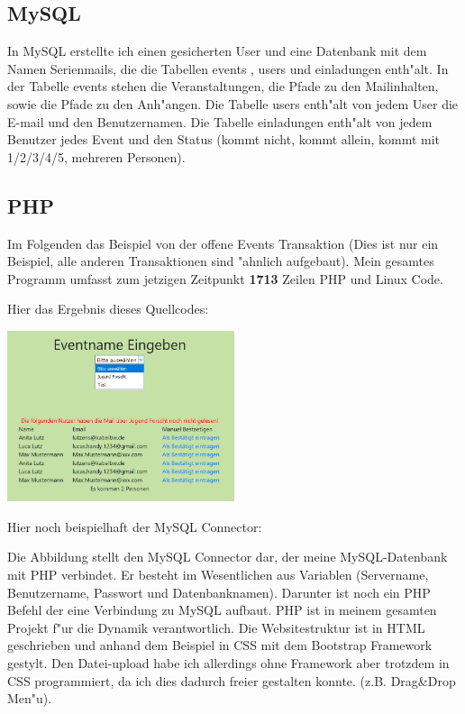 \documentclass[12pt,twoside]{article}  %
\begin{document}
  
  \subsection{MySQL}
  In MySQL 
  \cite{mysql} 
  erstellte ich einen gesicherten User und eine Datenbank mit dem Namen \glqq Serienmails\grqq, die die Tabellen \glqq events \grqq, 
  \glqq users\grqq{} und \glqq einladungen\grqq{} enth"alt. In der Tabelle \glqq events\grqq{} stehen die Veranstaltungen, die Pfade 
  zu den Mailinhalten, sowie die Pfade zu den Anh"angen. Die Tabelle \glqq users\grqq{} enth"alt von jedem 
  User die E-mail und den Benutzernamen. Die Tabelle \glqq einladungen\grqq{} enth"alt von jedem Benutzer jedes Event 
  und den Status (kommt nicht, kommt allein, kommt mit 1/2/3/4/5, mehreren Personen).
  \subsection{PHP}
  Im Folgenden das Beispiel von der \glqq offene Events\grqq{} Transaktion (Dies ist nur ein Beispiel, alle anderen 
  Transaktionen sind "ahnlich aufgebaut). Mein gesamtes Programm umfasst zum jetzigen Zeitpunkt \textbf{1713} Zeilen PHP und Linux Code.
  
  Hier das Ergebnis dieses Quellcodes:
\begin{center}
  \includegraphics[width=0.5\textwidth]{code-ergebniss.jpg}
\end{center}
  Hier noch beispielhaft der MySQL Connector: 
  
  Die Abbildung stellt den MySQL Connector dar, der meine MySQL-Datenbank mit PHP verbindet. Er besteht im 
  Wesentlichen aus Variablen (Servername, Benutzername, Passwort und 
  Datenbanknamen). Darunter ist noch ein PHP Befehl der  
  eine Verbindung zu MySQL aufbaut. 
  PHP ist in meinem gesamten Projekt f"ur die Dynamik verantwortlich. Die 
  Websitestruktur ist in HTML geschrieben und anhand dem Beispiel \cite{bootstrapExample} in CSS 
  mit dem \glqq Bootstrap\grqq{} Framework gestylt. Den Datei-upload habe ich allerdings ohne Framework aber trotzdem in CSS programmiert, da ich dies dadurch freier gestalten konnte. (z.B. Drag\&Drop Men"u).
  
\end{document}
